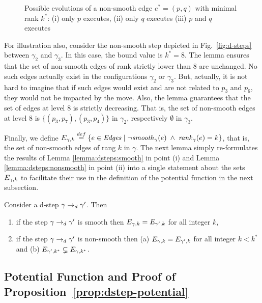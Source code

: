 \begin{figure}[th]
  \begin{center}
    \scalebox{0.9}{}
  \end{center}
  \caption{\label{fig:dsteps:proof}Possible evolutions of a non-smooth edge $e^*=(p,q)$ with
    minimal rank $k^*$: (i) only $p$ executes, (ii) only $q$ executes
    (iii) $p$ and $q$ executes}
\end{figure}

For illustration also, consider the non-smooth step depicted in
Fig.~\ref{fig:d-steps} between $\gamma_2$ and $\gamma_3$.  In this
case, the bound value is $k^* = 8$.  The lemma ensures that the set of
non-smooth edges of rank strictly lower than $8$ are unchanged.  No
such edges actually exist in the configurations $\gamma_2$ or
$\gamma_3$. But, actually, it is not hard to imagine that if such
edges would exist and are not related to $p_3$ and $p_6$, they would
not be impacted by the move.  Also, the lemma guarantees that the set
of edges at level 8 is strictly decreasing.  That is, the set of
non-smooth edges at level 8 is $\{ (p_3,p_7), (p_3,p_4) \}$ in
$\gamma_2$, respectively $\emptyset$ in $\gamma_3$.

Finally, we define $E_{\gamma,k} \stackrel{def}= \{ e \in \mathit{Edges} \mid \neg
\mathit{smooth}_{\gamma}(e) \;\wedge\; \mathit{rank}_{\gamma}(e) = k \}$, that is, the
set of non-smooth edges of rang $k$ in $\gamma$.  The next lemma
simply re-formulates the results of Lemma \ref{lemma:dsteps:smooth} in
point (i) and Lemma \ref{lemma:dsteps:nonsmooth} in point (ii) into a
single statement about the sets $E_{\gamma,k}$ to
facilitate their use in the definition of the potential function in
the next subsection.

\begin{lemma}\label{lemma:dsteps}
  Consider a d-step $\gamma \rightarrow_d \gamma'$.  Then
  \begin{enumerate}[label=(\roman*)]
  \item if the step $\gamma \rightarrow_d \gamma'$ is smooth then
    $E_{\gamma,k} = E_{\gamma',k}$ for all integer $k$,
  \item if the step $\gamma \rightarrow_d \gamma'$ is non-smooth then
    (a) $E_{\gamma,k} = E_{\gamma',k}$ for all integer $k <
    k^*$ and (b) $E_{\gamma',k^*} \subsetneq
    E_{\gamma,k^*}$.
  \end{enumerate}
\end{lemma}

\subsection{Potential Function and Proof of
  Proposition~\ref{prop:dstep-potential}} 
\label{sec:dstep-potential:function}

